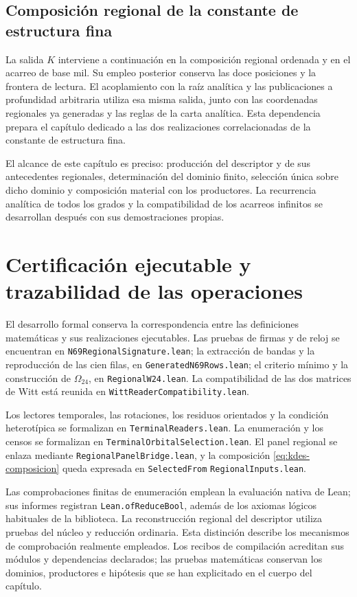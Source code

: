 \subsection{Composición regional de la constante de estructura fina}

La salida $K$ interviene a continuación en la composición regional
ordenada y en el acarreo de base mil. Su empleo posterior conserva las
doce posiciones y la frontera de lectura. El acoplamiento con la raíz
analítica y las publicaciones a profundidad arbitraria utiliza esa
misma salida, junto con las coordenadas regionales ya generadas y las
reglas de la carta analítica. Esta dependencia prepara el capítulo
dedicado a las dos realizaciones correlacionadas de la constante de
estructura fina.

El alcance de este capítulo es preciso: producción del descriptor y
de sus antecedentes regionales, determinación del dominio finito,
selección única sobre dicho dominio y composición material con los
productores. La recurrencia analítica de todos los grados y la
compatibilidad de los acarreos infinitos se desarrollan después con sus
demostraciones propias.

\section{Certificación ejecutable y trazabilidad de las operaciones}

El desarrollo formal conserva la correspondencia entre las
definiciones matemáticas y sus realizaciones ejecutables. Las pruebas
de firmas y de reloj se encuentran en
\texttt{N69RegionalSignature.lean}; la extracción de bandas y la
reproducción de las cien filas, en
\texttt{GeneratedN69Rows.lean}; el criterio mínimo y la construcción
de $\Omega_{24}$, en \texttt{RegionalW24.lean}. La compatibilidad de
las dos matrices de Witt está reunida en
\texttt{WittReaderCompatibility.lean}.

Los lectores temporales, las rotaciones, los residuos orientados y la
condición heterotípica se formalizan en
\texttt{TerminalReaders.lean}. La enumeración y los censos se
formalizan en \texttt{Terminal}\allowbreak\texttt{Orbital}\allowbreak\texttt{Selection.lean}. El panel
regional se enlaza mediante \texttt{Regional}\allowbreak\texttt{Panel}\allowbreak\texttt{Bridge.lean}, y la
composición \eqref{eq:kdes-composicion} queda expresada en
\texttt{Selected}\allowbreak\texttt{From}\allowbreak%
\texttt{Regional}\allowbreak\texttt{Inputs.lean}.

Las comprobaciones finitas de enumeración emplean la evaluación nativa
de Lean; sus informes registran \texttt{Lean.ofReduceBool}, además
de los axiomas lógicos habituales de la biblioteca. La reconstrucción
regional del descriptor utiliza pruebas del núcleo y reducción
ordinaria. Esta distinción describe los mecanismos de comprobación
realmente empleados. Los recibos de compilación acreditan sus módulos
y dependencias declarados; las pruebas matemáticas conservan los
dominios, productores e hipótesis que se han explicitado en el cuerpo
del capítulo.
